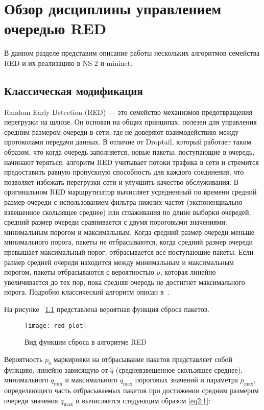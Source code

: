 \chapter{Обзор дисциплины управлением очередью RED}
\label{chap2}

В данном разделе представим описание работы нескольких алгоритмов семейства RED и их реализацию в NS-2 и mininet. 


\section{Классическая модификация}
\label{chap2:sec1}

Random Early Detection (RED) — это семейство механизмов предотвращения перегрузки
на шлюзе. Он основан на общих принципах, полезен для управления
средним размером очереди в сети, где не доверяют взаимодействию между
протоколами передачи данных. В отличие от Droptail, который работает
таким образом, что когда очередь заполняется, новые пакеты,
поступающие в очередь, начинают теряться, алгоритм RED учитывает
потоки трафика в сети и стремится предоставить равную пропускную
способность для каждого соединения, что позволяет избежать перегрузки
сети и улучшить качество обслуживания. В оригинальном RED
маршрутизатор вычисляет усредненный по времени средний размер очереди
с использованием фильтра нижних частот (экспоненциально взвешенное
скользящее среднее) или сглаживания по длине выборки очередей, средний
размер очереди сравнивается с двумя пороговыми значениями: минимальным
порогом и максимальным. Когда средний размер очереди меньше
минимального порога, пакеты не отбрасываются, когда средний размер
очереди превышает максимальный порог, отбрасывается все поступающие
пакеты. Если размер средней очереди находится между минимальным и
максимальным порогом, пакеты отбрасываются с вероятностью $p$, которая
линейно увеличивается до тех пор, пока средняя очередь не достигнет
максимального порога. Подробно классический алгоритм описан в~\cite{RED1, RED0}.


На рисунке ~\ref{fig1} представлена вероятная функция сброса пакетов.
 
\begin{figure}[h!]
 \centerline{\texttt{[image: red\_plot]}}
 \caption{Вид функции сброса в алгоритме RED}
\label{fig1}
\end{figure}


Вероятность $p_{b}$ маркировки на отбрасывание пакетов представляет
собой функцию, линейно зависящую от $\hat{q}$ (средневзвешенное
скользящее среднее), минимального $q_{\min}$ и максимального
$q_{\max}$ пороговых значений и параметра $p_{\max}$, определяющего
часть отбрасываемых пакетов при достижении средним размером очереди
значения $q_{\max}$ и вычисляется следующим образом \eqref{eq2:1}:

